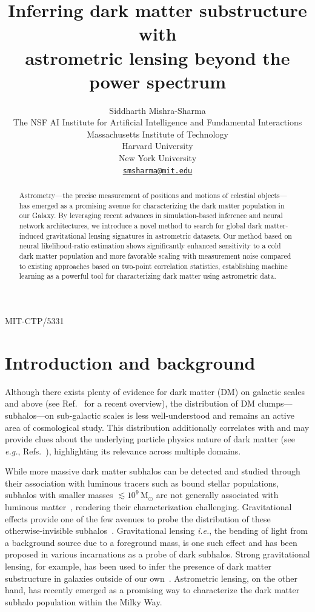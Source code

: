 \documentclass[preprint]{article}
\title{Inferring dark matter substructure with \\ astrometric lensing beyond the power spectrum}
\author{
Siddharth Mishra-Sharma \\
The NSF AI Institute for Artificial Intelligence and Fundamental Interactions \\
Massachusetts Institute of Technology \\
Harvard University \\ 
New York University \\
\href{mailto:smsharma@mit.edu}{\texttt{smsharma@mit.edu}} \\
}
\begin{document}
\hfill MIT-CTP/5331
\maketitle

\begin{abstract}
Astrometry---the precise measurement of positions and motions of celestial objects---has emerged as a promising avenue for characterizing the dark matter population in our Galaxy. By leveraging recent advances in simulation-based inference and neural network architectures, we introduce a novel method to search for global dark matter-induced gravitational lensing signatures in astrometric datasets. Our method based on neural likelihood-ratio estimation shows significantly enhanced sensitivity to a cold dark matter population and more favorable scaling with measurement noise compared to existing approaches based on two-point correlation statistics, establishing machine learning as a powerful tool for characterizing dark matter using astrometric data. 
\end{abstract}

\section{Introduction and background}
\label{sec:intro}

Although there exists plenty of evidence for dark matter (DM) on galactic scales and above (see Ref.~\cite{Green:2021jrr} for a recent overview), the distribution of DM clumps---subhalos---on sub-galactic scales is less well-understood and remains an active area of cosmological study. This distribution additionally correlates with and may provide clues about the underlying particle physics nature of dark matter (see \emph{e.g.}, Refs.~\cite{Schutz:2020jox,Bode:2000gq,Dalcanton:2000hn}), highlighting its relevance across multiple domains.

While more massive dark matter subhalos can be detected and studied through their association with luminous tracers such as bound stellar populations, subhalos with smaller masses $\lesssim 10^9\,\mathrm M_\odot$ are not generally associated with luminous matter~\cite{Fitts:2016usl,2017MNRAS.467.2019R}, rendering their characterization challenging. Gravitational effects provide one of the few avenues to probe the distribution of these otherwise-invisible subhalos~\cite{Buckley:2017ijx}. Gravitational lensing \emph{i.e.}, the bending of light from a background source due to a foreground mass, is one such effect and has been proposed in various incarnations as a probe of dark subhalos. 
Strong gravitational lensing, for example, has been used to infer the presence of dark matter substructure in galaxies outside of our own~\cite{Hezaveh:2016ltk,Vegetti:2009cz,Gilman:2019nap,Vegetti:2012mc}.
Astrometric lensing, on the other hand, has recently emerged as a promising way to characterize the dark matter subhalo population within the Milky Way.
\end{document}
